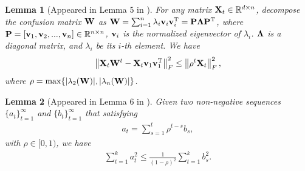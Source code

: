 \documentclass{article}
\newtheorem{Lemma}{\bf{Lemma}}
\begin{document}
\begin{Lemma}[Appeared in Lemma $5$ in \citep{Tang:2018un}]
\label{lemma_hanlin_1}
For any matrix ${\bf X}_t\in\mathbb{R}^{d\times n}$, decompose the confusion matrix ${\bf W}$ as ${\bf W} = \sum_{i=1}^n \lambda_i {\bf v}_i {\bf v}_i^{\rm T} = {\bf P} \mathbf{\Lambda} {\bf P}^{\rm T}$, where ${\bf P} = [{\bf v}_1, {\bf v}_2, ..., {\bf v}_n]\in\mathbb{R}^{n\times n}$, ${\bf v}_i$ is the normalized eigenvector of $\lambda_i$. $\mathbf{\Lambda}$ is a diagonal matrix, and $\lambda_i$ be its $i$-th element. We have
\begin{align}
\nonumber
\left\lVert{\bf X}_t {\bf W}^t - {\bf X}_t {\bf v}_1 {\bf v}_1^{\rm T} \right\rVert_F^2 \le \left\lVert\rho^t {\bf X}_t\right\rVert_F^2, 
\end{align} where  $\rho = \max \{| \lambda_2({\bf W}) |, | \lambda_n({\bf W}) |\}$. 

\end{Lemma}


\begin{Lemma}[Appeared in Lemma $6$ in \citep{Tang:2018un}]
\label{lemma_hanlin_2}
Given two non-negative sequences $\{a_t\}_{t=1}^{\infty}$ and $\{b_t\}_{t=1}^{\infty}$ that satisfying
\begin{align}
\nonumber
a_t = \sum_{s=1}^t \rho^{t-s} b_s,
\end{align} with $\rho \in [0,1)$, we have
\begin{align}
\nonumber
\sum_{t=1}^k a_t^2 \le \frac{1}{(1-\rho)^2}\sum_{t=1}^k b_s^2.
\end{align}
\end{Lemma}


















\end{document}

